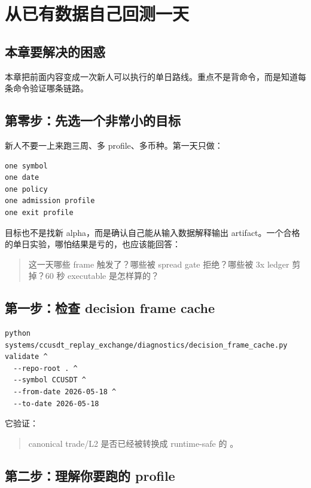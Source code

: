 \chapter{从已有数据自己回测一天}

\section{本章要解决的困惑}

本章把前面内容变成一次新人可以执行的单日路线。重点不是背命令，而是知道每条命令验证哪条链路。

\section{第零步：先选一个非常小的目标}

新人不要一上来跑三周、多 profile、多币种。第一天只做：

\begin{lstlisting}
one symbol
one date
one policy
one admission profile
one exit profile
\end{lstlisting}

目标也不是找新 alpha，而是确认自己能从输入数据解释输出 artifact。一个合格的单日实验，哪怕结果是亏的，也应该能回答：

\begin{quote}
这一天哪些 frame 触发了？哪些被 spread gate 拒绝？哪些被 3x ledger 剪掉？60 秒 executable 是怎样算的？
\end{quote}

\section{第一步：检查 decision frame cache}

\begin{lstlisting}
python systems/ccusdt_replay_exchange/diagnostics/decision_frame_cache.py validate ^
  --repo-root . ^
  --symbol CCUSDT ^
  --from-date 2026-05-18 ^
  --to-date 2026-05-18
\end{lstlisting}

它验证：

\begin{quote}
canonical trade/L2 是否已经被转换成 runtime-safe 的 。
\end{quote}

\section{第二步：理解你要跑的 profile}

